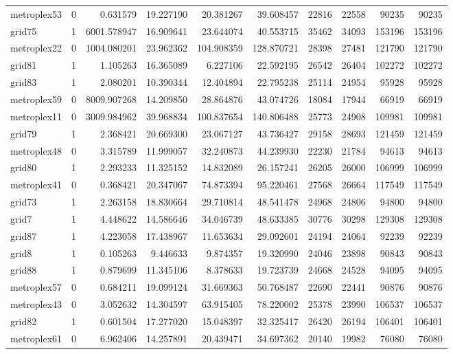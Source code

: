 \begin{longtable}{|l|r|r|r|r|r|r|r|r|r|}
metroplex53 & 0 & 0.631579 & 19.227190 & 20.381267 & 39.608457 & 22816 & 22558 & 90235 & 90235 \\
grid75 & 1 & 6001.578947 & 16.909641 & 23.644074 & 40.553715 & 35462 & 34093 & 153196 & 153196 \\
metroplex22 & 0 & 1004.080201 & 23.962362 & 104.908359 & 128.870721 & 28398 & 27481 & 121790 & 121790 \\
grid81 & 1 & 1.105263 & 16.365089 & 6.227106 & 22.592195 & 26542 & 26404 & 102272 & 102272 \\
grid83 & 1 & 2.080201 & 10.390344 & 12.404894 & 22.795238 & 25114 & 24954 & 95928 & 95928 \\
metroplex59 & 0 & 8009.907268 & 14.209850 & 28.864876 & 43.074726 & 18084 & 17944 & 66919 & 66919 \\
metroplex11 & 0 & 3009.984962 & 39.968834 & 100.837654 & 140.806488 & 25773 & 24908 & 109981 & 109981 \\
grid79 & 1 & 2.368421 & 20.669300 & 23.067127 & 43.736427 & 29158 & 28693 & 121459 & 121459 \\
metroplex48 & 0 & 3.315789 & 11.999057 & 32.240873 & 44.239930 & 22230 & 21784 & 94613 & 94613 \\
grid80 & 1 & 2.293233 & 11.325152 & 14.832089 & 26.157241 & 26205 & 26000 & 106999 & 106999 \\
metroplex41 & 0 & 0.368421 & 20.347067 & 74.873394 & 95.220461 & 27568 & 26664 & 117549 & 117549 \\
grid73 & 1 & 2.263158 & 18.830664 & 29.710814 & 48.541478 & 24968 & 24806 & 94800 & 94800 \\
grid7 & 1 & 4.448622 & 14.586646 & 34.046739 & 48.633385 & 30776 & 30298 & 129308 & 129308 \\
grid87 & 1 & 4.223058 & 17.438967 & 11.653634 & 29.092601 & 24194 & 24064 & 92239 & 92239 \\
grid8 & 1 & 0.105263 & 9.446633 & 9.874357 & 19.320990 & 24046 & 23898 & 90843 & 90843 \\
grid88 & 1 & 0.879699 & 11.345106 & 8.378633 & 19.723739 & 24668 & 24528 & 94095 & 94095 \\
metroplex57 & 0 & 0.684211 & 19.099124 & 31.669363 & 50.768487 & 22690 & 22441 & 90876 & 90876 \\
metroplex43 & 0 & 3.052632 & 14.304597 & 63.915405 & 78.220002 & 25378 & 23990 & 106537 & 106537 \\
grid82 & 1 & 0.601504 & 17.277020 & 15.048397 & 32.325417 & 26420 & 26194 & 106401 & 106401 \\
metroplex61 & 0 & 6.962406 & 14.257891 & 20.439471 & 34.697362 & 20140 & 19982 & 76080 & 76080 \\

\end{longtable}
